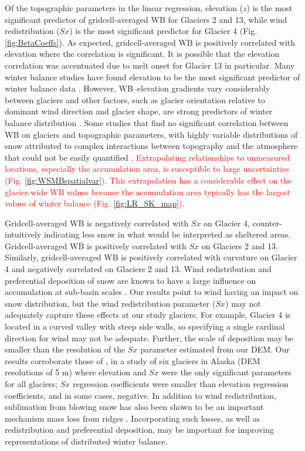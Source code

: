 \documentclass[twocolumn, letterpaper]{igs}
\begin{document}
Of the topographic parameters in the linear regression, elevation ($z$) is the most significant predictor of gridcell-averaged WB for Glaciers 2 and 13, while wind redistribution ($Sx$) is the most significant predictor for Glacier 4 (Fig. \ref{fig:BetaCoeffs}). As expected, gridcell-averaged WB is positively correlated with elevation where the correlation is significant. It is possible that the elevation correlation was accentuated due to melt onset for Glacier 13 in particular. Many winter balance studies have found elevation to be the most significant predictor of winter balance data \citep[e.g.][]{Machguth2006, McGrath2015}. However, WB--elevation gradients vary considerably between glaciers \citep[e.g.][]{Winther1998} and other factors, such as glacier orientation relative to dominant wind direction and glacier shape, are strong predictors of winter balance distribution \citep{Machguth2006,Grabiec2011}. Some studies that find no significant correlation between WB on glaciers and topographic parameters, with highly variable distributions of snow attributed to complex interactions between topography and the atmosphere that could not be easily quantified \citep[e.g.][]{Grabiec2011,Lopez2011}. \textcolor{red}{Extrapolating relationships to unmeasured locations, especially the accumulation area, is susceptible to large uncertainties (Fig. \ref{fig:WSMBspatialvar}). This extrapolation has a considerable effect on the glacier-wide WB values because the accumulation area typically has the largest values of winter balance (Fig. \ref{fig:LR_SK_map}). }

Gridcell-averaged WB is negatively correlated with $Sx$ on Glacier 4, counter-intuitively indicating less snow in what would be interpreted as sheltered areas. Gridcell-averaged WB is positively correlated with $Sx$ on Glaciers 2 and 13. Similarly, gridcell-averaged WB is positively correlated with curvature on Glacier 4 and negatively correlated on Glaciers 2 and 13. Wind redistribution and preferential deposition of snow are known to have a large influence on accumulation at sub-basin scales \citep[e.g.][]{Dadic2010, Winstral2013,Gerber2017}. Our results point to wind having an impact on snow distribution, but the wind redistribution parameter ($Sx$) may not adequately capture these effects at our study glaciers. For example, Glacier 4 is located in a curved valley with steep side walls, so specifying a single cardinal direction for wind may not be adequate. Further, the scale of deposition may be smaller than the resolution of the $Sx$ parameter estimated from our DEM. Our results corroborate those of \cite{McGrath2015}, in a study of six glaciers in Alaska (DEM resolutions of 5 m) where elevation and $Sx$ were the only significant parameters for all glaciers; $Sx$ regression coefficients were smaller than elevation regression coefficients, and in some cases, negative. In addition to wind redistribution, sublimation from blowing snow has also been shown to be an important mechanism mass loss from ridges  \citep[e.g.][]{Musselman2015}. Incorporating such losses, as well as redistribution and preferential deposition, may be important for improving representations of distributed winter balance. 
\end{document}
